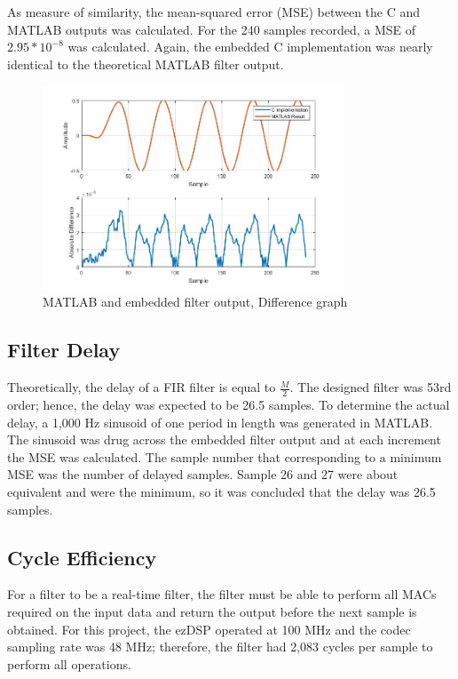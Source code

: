\documentclass[11pt,pdftex,portrait,letterpaper]{article}
\begin{document}
As measure of similarity, the mean-squared error (MSE) between the C and MATLAB outputs was calculated. For the 240 samples recorded, a MSE of \(2.95*10^{-8}\) was calculated. Again, the embedded C implementation was nearly identical to the theoretical MATLAB filter output.

\begin{figure}[h]
\centering
\includegraphics[width=0.8\textwidth]{./img2}
\caption{MATLAB and embedded filter output, Difference graph}
\label{f:fig2}
\end{figure}

\subsection{Filter Delay}

Theoretically, the delay of a FIR filter is equal to \(\frac{M}{2}\). The designed filter was 53rd order; hence, the delay was expected to be 26.5 samples. To determine the actual delay, a 1,000 Hz sinusoid of one period in length was generated in MATLAB. The sinusoid was drug across the embedded filter output and at each increment the MSE was calculated. The sample number that corresponding to a minimum MSE was the number of delayed samples. Sample 26 and 27 were about equivalent and were the minimum, so it was concluded that the delay was 26.5 samples.

\subsection{Cycle Efficiency}

For a filter to be a real-time filter, the filter must be able to perform all MACs required on the input data and return the output before the next sample is obtained. For this project, the ezDSP operated at 100 MHz and the codec sampling rate was 48 MHz; therefore, the filter had 2,083 cycles per sample to perform all operations.
\end{document}
